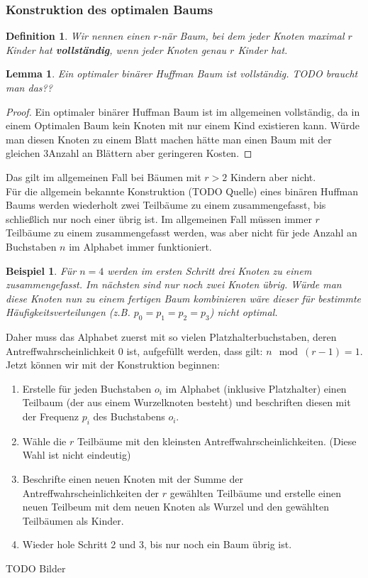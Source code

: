 \documentclass[a4paper,10pt,ngerman]{scrartcl}
\newtheorem{definition}[satz]{Definition}
\newtheorem{lemma}[satz]{Lemma}
\newtheorem{beispiel}[satz]{Beispiel}
\begin{document}
    \subsubsection{Konstruktion des optimalen Baums}
    \begin{definition}
        Wir nennen einen $r$-när Baum, bei dem jeder Knoten maximal $r$ Kinder hat \textbf{vollständig}, wenn jeder Knoten genau $r$ Kinder hat.
    \end{definition}
    \begin{lemma}
        Ein optimaler binärer Huffman Baum ist vollständig. TODO braucht man das??
    \end{lemma}
    \begin{proof}
        Ein optimaler binärer Huffman Baum ist im allgemeinen vollständig, da in einem Optimalen Baum kein Knoten mit nur einem Kind existieren kann.
        Würde man diesen Knoten zu einem Blatt machen hätte man einen Baum mit der gleichen 3Anzahl an Blättern aber geringeren Kosten.
    \end{proof}
    Das gilt im allgemeinen Fall bei Bäumen mit $r > 2$ Kindern aber nicht. \\
    Für die allgemein bekannte Konstruktion (TODO Quelle) eines binären Huffman Baums werden wiederholt zwei Teilbäume zu einem zusammengefasst, bis schließlich nur noch einer übrig ist. %
    Im allgemeinen Fall müssen immer $r$ Teilbäume zu einem zusammengefasst werden, was aber nicht für jede Anzahl an Buchstaben $n$ im Alphabet immer funktioniert.
    \begin{beispiel}
        Für $n = 4$ werden im ersten Schritt drei Knoten zu einem zusammengefasst. Im nächsten sind nur noch zwei Knoten übrig. Würde man diese Knoten nun zu einem fertigen Baum kombinieren wäre dieser für bestimmte Häufigkeitsverteilungen (z.B. $p_0 = p_1 = p_2 = p_3$) nicht optimal.
    \end{beispiel}
    Daher muss das Alphabet zuerst mit so vielen Platzhalterbuchstaben, deren Antreffwahrscheinlichkeit 0 ist, aufgefüllt werden, dass gilt: $n \mod (r - 1) = 1$.\\ %
    Jetzt können wir mit der Konstruktion beginnen:
    \begin{enumerate}
        \item Erstelle für jeden Buchstaben $o_i$ im Alphabet (inklusive Platzhalter) einen Teilbaum (der aus einem Wurzelknoten besteht) und beschriften diesen mit der Frequenz $p_i$ des Buchstabens $o_i$.
        \item Wähle die $r$ Teilbäume mit den kleinsten Antreffwahrscheinlichkeiten. (Diese Wahl ist nicht eindeutig)
        \item Beschrifte einen neuen Knoten mit der Summe der Antreffwahrscheinlichkeiten der $r$ gewählten Teilbäume und erstelle einen neuen Teilbeum mit dem neuen Knoten als Wurzel und den gewählten Teilbäumen als Kinder.
        \item Wieder hole Schritt 2 und 3, bis nur noch ein Baum übrig ist.
    \end{enumerate}
    TODO Bilder
\end{document}
